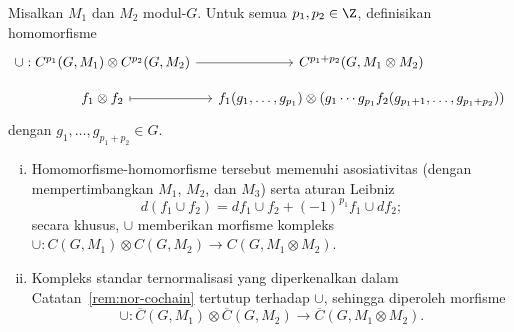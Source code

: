 \begin{definisi-proposisi}\label{def:group-cup-3}
	Misalkan $M_1$ dan $M_2$ modul-$G$. Untuk semua $p_1,p_2\in\Z$, definisikan
	homomorfisme
	\[\begin{tikzcd}[row sep=small, column sep=small]
		\cup: C^{p_1}(G, M_1) \otimes C^{p_2}(G, M_2) \arrow[r] & C^{p_1 + p_2}(G, M_1 \otimes M_2) \\
		f_1 \otimes f_2 \arrow[mapsto, r] & f_1(g_1, \ldots, g_{p_1}) \otimes (g_1 \cdots g_{p_1} f_2(g_{p_1 + 1}, \ldots, g_{p_1 + p_2}))
	\end{tikzcd}\]
	dengan $g_1,\ldots,g_{p_1+p_2}\in G$.
	\begin{enumerate}[(i)]
		\item Homomorfisme-homomorfisme tersebut memenuhi asosiativitas (dengan
		mempertimbangkan $M_1$, $M_2$, dan $M_3$) serta aturan Leibniz
		\[ d(f_1 \cup f_2) = df_1 \cup f_2 + (-1)^{p_1} f_1 \cup d f_2; \]
		secara khusus, $\cup$ memberikan morfisme kompleks
		$\cup:C(G,M_1)\otimes C(G,M_2)\to C(G,M_1\otimes M_2)$.
		\item Kompleks standar ternormalisasi yang diperkenalkan dalam
		Catatan~\ref{rem:nor-cochain} tertutup terhadap $\cup$, sehingga diperoleh
		morfisme
		\[ \cup: \overline{C}(G, M_1) \otimes \overline{C}(G, M_2) \to \overline{C}(G, M_1 \otimes M_2). \]
	\end{enumerate}
\end{definisi-proposisi}

